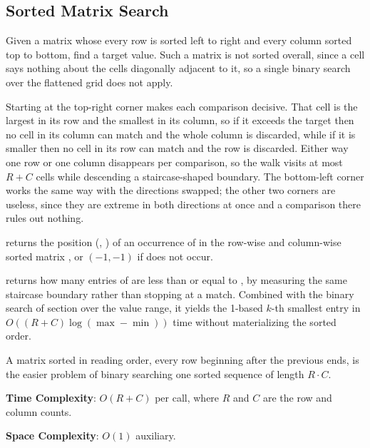 \subsection{Sorted Matrix Search}
\label{sec:5.1.4}
Given a matrix whose every row is sorted left to right and every column sorted top to bottom, find a target value. Such a matrix is not sorted overall, since a cell says nothing about the cells diagonally adjacent to it, so a single binary search over the flattened grid does not apply.

Starting at the top-right corner makes each comparison decisive. That cell is the largest in its row and the smallest in its column, so if it exceeds the target then no cell in its column can match and the whole column is discarded, while if it is smaller then no cell in its row can match and the row is discarded. Either way one row or one column disappears per comparison, so the walk visits at most $R + C$ cells while descending a staircase-shaped boundary. The bottom-left corner works the same way with the directions swapped; the other two corners are useless, since they are extreme in both directions at once and a comparison there rules out nothing.

\begin{compactitem}
  \item {} returns the position (, ) of an occurrence of  in the row-wise and column-wise sorted matrix , or $(-1, -1)$ if  does not occur.
  \item {} returns how many entries of  are less than or equal to , by measuring the same staircase boundary rather than stopping at a match. Combined with the binary search of section  over the value range, it yields the 1-based $k$-th smallest entry in $O((R + C) \log\left(\max - \min\right))$ time without materializing the sorted order.
\end{compactitem}

A matrix sorted in reading order, every row beginning after the previous ends, is the easier problem of binary searching one sorted sequence of length $R \cdot C$.

\textbf{Time Complexity}: $O(R + C)$ per call, where $R$ and $C$ are the row and column counts.

\textbf{Space Complexity}: $O(1)$ auxiliary.

